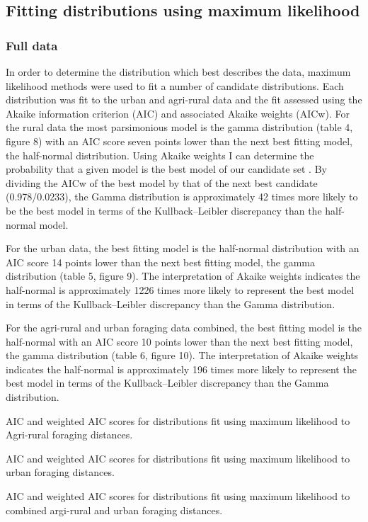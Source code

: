 \documentclass[11pt,usenames,dvipsnames,a4paper]{article}
\begin{document}
\subsection{Fitting distributions using maximum likelihood}

\subsubsection{Full data}

\begin{linenumbers}
\hspace{\parindent}
In order to determine the distribution which best describes the data, maximum likelihood methods were used to fit a number of candidate distributions. Each distribution was fit to the urban and agri-rural data and the fit assessed using the Akaike information criterion (AIC) and associated Akaike weights (AICw). For the rural data the most parsimonious model is the gamma distribution (table 4, figure 8) with an AIC score seven points lower than the next best fitting model, the half-normal distribution. Using Akaike weights I can determine the probability that a given model is the best model of our candidate set \citep{Burnham2004}. By dividing the AICw of the best model by that of the next best candidate (0.978/0.0233), the Gamma distribution is approximately 42 times more likely to be the best model in terms of the Kullback–Leibler discrepancy than the half-normal model.

For the urban data, the best fitting model is the half-normal distribution with an AIC score 14 points lower than the next best fitting model, the gamma distribution (table 5, figure 9). The interpretation of Akaike weights indicates the half-normal is approximately 1226 times more likely to represent the best model in terms of the Kullback–Leibler discrepancy than the Gamma distribution.

For the agri-rural and urban foraging data combined, the best fitting model is the half-normal with an AIC score 10 points lower than the next best fitting model, the gamma distribution (table 6, figure 10). The interpretation of Akaike weights indicates the half-normal is approximately 196 times more likely to represent the best model in terms of the Kullback–Leibler discrepancy than the Gamma distribution.
\end{linenumbers}

\begin{table}[H]
	\centering
	\caption{AIC and weighted AIC scores for distributions fit using maximum likelihood to Agri-rural foraging distances.}
	
\end{table}
\begin{table}[H]
	\centering
	\caption{AIC and weighted AIC scores for distributions fit using maximum likelihood to urban foraging distances.}
	
\end{table}
\begin{table}[H]
	\centering
	\caption{AIC and weighted AIC scores for distributions fit using maximum likelihood to combined argi-rural and urban foraging distances.}
	
\end{table}
\end{document}

